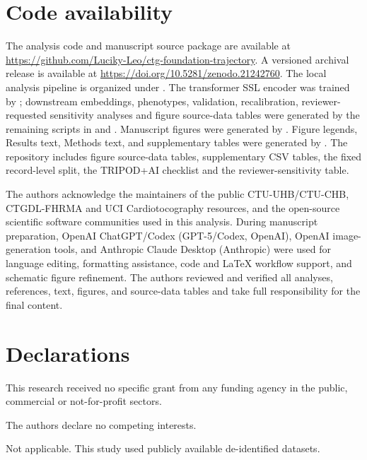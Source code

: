 \documentclass[pdflatex,sn-nature]{sn-jnl}
\begin{document}
\section{Code availability}

The analysis code and manuscript source package are available at \url{https://github.com/Luciky-Leo/ctg-foundation-trajectory}. A versioned archival release is available at \url{https://doi.org/10.5281/zenodo.21242760}. The local analysis pipeline is organized under . The transformer SSL encoder was trained by ; downstream embeddings, phenotypes, validation, recalibration, reviewer-requested sensitivity analyses and figure source-data tables were generated by the remaining scripts in  and . Manuscript figures were generated by . Figure legends, Results text, Methods text, and supplementary tables were generated by . The repository includes figure source-data tables, supplementary CSV tables, the fixed record-level split, the TRIPOD+AI checklist and the reviewer-sensitivity table.

\backmatter

The authors acknowledge the maintainers of the public CTU-UHB/CTU-CHB, CTGDL-FHRMA and UCI Cardiotocography resources, and the open-source scientific software communities used in this analysis. During manuscript preparation, OpenAI ChatGPT/Codex (GPT-5/Codex, OpenAI), OpenAI image-generation tools, and Anthropic Claude Desktop (Anthropic) were used for language editing, formatting assistance, code and LaTeX workflow support, and schematic figure refinement. The authors reviewed and verified all analyses, references, text, figures, and source-data tables and take full responsibility for the final content.

\section*{Declarations}

This research received no specific grant from any funding agency in the public, commercial or not-for-profit sectors.

The authors declare no competing interests.

Not applicable. This study used publicly available de-identified datasets.
\end{document}
